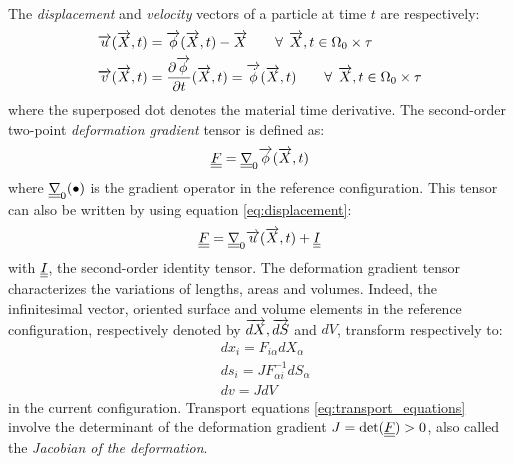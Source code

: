The \textit{displacement} and \textit{velocity} vectors of a particle at time $t$ are respectively:
\begin{align}
    &{\overrightarrow{u}}({\overrightarrow{X}},t)={\overrightarrow{\phi}}({\overrightarrow{X}},t) - {\overrightarrow{X}} \qquad \forall\:\: {\overrightarrow{X}},t \in \Omega_0\times \tau  \label{eq:displacement}\\
    &{\overrightarrow{v}}({\overrightarrow{X}},t)=\frac{\partial {\overrightarrow{\phi}}}{\partial t}({\overrightarrow{X}},t) = {\overrightarrow{\dot{\phi}}}({\overrightarrow{X}},t) \qquad  \forall\: \: {\overrightarrow{X}},t \in \Omega_0\times \tau  \label{eq:velocity}
\end{align}
where the superposed dot denotes the material time derivative. The second-order two-point \textit{deformation gradient} tensor is defined as:
\begin{equation}
  \label{eq:F_phi}
    {\underline{\underline{F}}}={\underline{\underline{\nabla}}}_0 {\overrightarrow{\phi}} ({\overrightarrow{X}},t)
\end{equation}
where ${\underline{\underline{\nabla}}}_0 (\bullet)$ is the gradient operator in the reference configuration. This tensor can also be written by using equation \eqref{eq:displacement}:
\begin{equation}
  {\underline{\underline{F}}}= {\underline{\underline{\nabla}}}_0 {\overrightarrow{u}}({\overrightarrow{X}},t) + {\underline{\underline{I}}} \label{eq:F_displacement}
\end{equation}
with ${\underline{\underline{I}}}$, the second-order identity tensor. The deformation gradient tensor characterizes the variations of lengths, areas and volumes. Indeed, the infinitesimal vector, oriented surface and volume elements in the reference configuration, respectively denoted by ${\overrightarrow{dX}},{\overrightarrow{dS}}$ and $dV$, transform respectively to:
\begin{equation}
  \label{eq:transport_equations}
  \begin{aligned}
    & dx_i=F_{i\alpha}dX_\alpha \\
    & ds_i=J F_{\alpha i}^{-1}dS_{\alpha} \\
    & dv=JdV 
  \end{aligned}
\end{equation}
in the current configuration. Transport equations \eqref{eq:transport_equations} involve the determinant of the deformation gradient $J=\det({\underline{\underline{F}}})>0$, also called the \textit{Jacobian of the deformation}.

